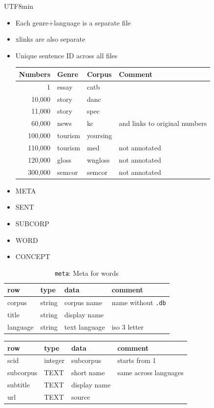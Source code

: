 \documentclass[25pt,landscape,headrule,footrule,dvips]{foils}
\newcommand{\emp}[1]{\textcolor{red}{#1}}
\newcommand{\myslide}[1]{\foilhead[-25mm]{\raisebox{12mm}[0mm]{\emp{#1}}}}
\begin{document}
\begin{CJK}{UTF8}{min}
\begin{itemize}
\item Each genre+language is a separate file
\item xlinks are also separate
\item Unique sentence ID across all files
  \begin{center}\small
    \begin{tabular}{rlll}
      Numbers & Genre & Corpus & Comment \\
      \hline
      1      & essay & catb &  \\
      10,000 & story & danc &  \\
      11,000 & story & spec &  \\
      60,000 & news & kc & and links to original numbers \\
      100,000 & tourism & yoursing &  \\
      110,000 & tourism & med & not annotated \\
      120,000 & gloss & wngloss & not annotated  \\
      300,000 & semcor & semcor & not annotated  
    \end{tabular}
  \end{center}

\end{itemize}


\myslide{Monolingual Corpus}
\begin{itemize}
\item META
\item SENT
\item SUBCORP
\item WORD
\item CONCEPT
\end{itemize}
\myslide{Meta}

\begin{table}[htpb]
  \centering
  \begin{tabular}{llll}
  \textbf{row}   &  \textbf{type} & \textbf{data} & \textbf{comment} \\
  \hline
  corpus & string & corpus name & name without \texttt{.db}\\
  title & string & display name & \\
  language & string & text language & iso 3 letter  \\
\hline
\end{tabular}
\caption{\texttt{meta}: Meta for words}
\end{table}

\myslide{Subcorpus Info}
  \begin{tabular}{llll}
  \textbf{row}   &  \textbf{type} & \textbf{data} & \textbf{comment} \\
  \hline
  scid  & integer & subcorpus & starts from 1\\
  subcorpus & TEXT & short name & same across languages\\
  subtitle &TEXT & display name & \\
  url & TEXT & source & 
\\ \hline
\end{tabular}


\end{CJK}
\end{document}
